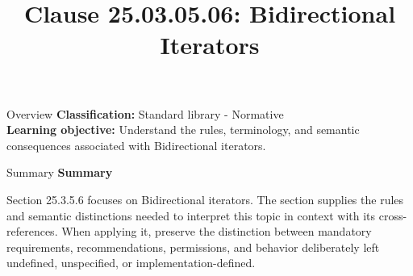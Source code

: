 \documentclass[10pt,letterpaper]{article}
\title{Clause 25.03.05.06: Bidirectional Iterators}
\author{}
\date{}
\begin{document}
\maketitle
\begin{CornellOverviewBox}{Overview}
\textbf{Classification:} Standard library - Normative\\[2pt]
\textbf{Learning objective:} Understand the rules, terminology, and semantic consequences associated with Bidirectional iterators.
\end{CornellOverviewBox}\begin{CornellSummaryBox}{Summary}
{\sffamily\bfseries\color{Accent} Summary}\par\vspace{3pt}Section 25.3.5.6 focuses on Bidirectional iterators. The section supplies the rules and semantic distinctions needed to interpret this topic in context with its cross-references. When applying it, preserve the distinction between mandatory requirements, recommendations, permissions, and behavior deliberately left undefined, unspecified, or implementation-defined.
\end{CornellSummaryBox}
\end{document}

